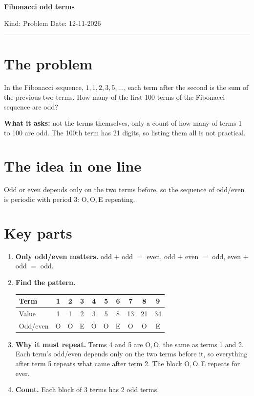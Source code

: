 \documentclass[11pt,a4paper]{article}
\begin{document}
{\LARGE\bfseries\color{accent} Fibonacci odd terms}\par
\vspace{2pt}
{\small Kind: Problem \quad Date: 12-11-2026}
\vspace{6pt}\hrule\vspace{6pt}

\section{The problem}
In the Fibonacci sequence, $1, 1, 2, 3, 5, \dots$, each term after the second is the sum of
the previous two terms. How many of the first 100 terms of the Fibonacci sequence are odd?

\textbf{What it asks:} not the terms themselves, only a count of how many of terms 1 to 100
are odd. The 100th term has 21 digits, so listing them all is not practical.

\section{The idea in one line}
Odd or even depends only on the two terms before, so the sequence of odd/even is periodic
with period 3: O,\,O,\,E repeating.

\section{Key parts}
\begin{enumerate}
  \item \textbf{Only odd/even matters.} odd $+$ odd $=$ even, odd $+$ even $=$ odd,
        even $+$ odd $=$ odd.
  \item \textbf{Find the pattern.}\par\smallskip
        \begin{tabular}{l|ccccccccc}
          Term  & 1 & 2 & 3 & 4 & 5 & 6 & 7 & 8 & 9 \\ \hline
          Value & 1 & 1 & 2 & 3 & 5 & 8 & 13 & 21 & 34 \\
          Odd/even & O & O & E & O & O & E & O & O & E
        \end{tabular}
  \item \textbf{Why it must repeat.} Terms 4 and 5 are O,\,O, the same as terms 1 and 2.
        Each term's odd/even depends only on the two terms before it, so everything after
        term 5 repeats what came after term 2. The block O,\,O,\,E repeats for ever.
  \item \textbf{Count.} Each block of 3 terms has 2 odd terms.
\end{enumerate}
\end{document}
